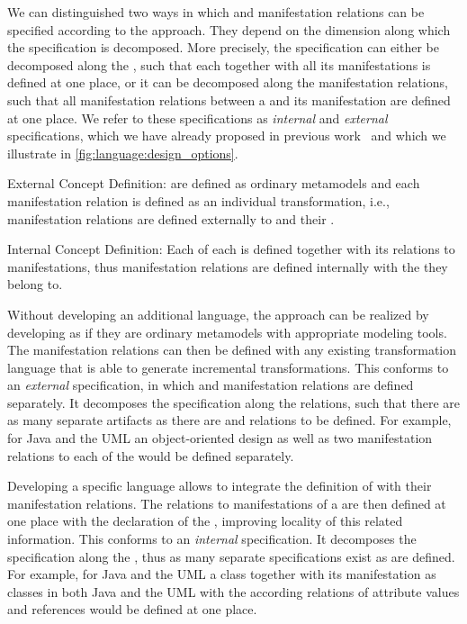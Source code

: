 We can distinguished two ways in which \conceptmetamodels and manifestation relations can be specified according to the \commonalities approach.
They depend on the dimension along which the specification is decomposed.
More precisely, the specification can either be decomposed along the \commonalities, such that each \commonality together with all its manifestations is defined at one place, or it can be decomposed along the manifestation relations, such that all manifestation relations between a \conceptmetamodel and its manifestation are defined at one place.
We refer to these specifications as \emph{internal} and \emph{external} specifications, which we have already proposed in previous work~ and which we illustrate in \autoref{fig:language:design_options}.
\begin{properdescription}
    \item[External Concept Definition:] \Conceptmetamodels are defined as ordinary metamodels and each manifestation relation is defined as an individual transformation, i.e., manifestation relations are defined externally to \conceptmetamodels and their \commonalities.
    \item[Internal Concept Definition:] Each \commonality of each \conceptmetamodel is defined together with its relations to manifestations, thus manifestation relations are defined internally with the \commonalities they belong to.
\end{properdescription}

Without developing an additional language, the \commonalities approach can be realized by developing \conceptmetamodels as if they are ordinary metamodels with appropriate modeling tools.
The manifestation relations can then be defined with any existing transformation language that is able to generate incremental transformations.
This conforms to an \emph{external} specification, in which \conceptmetamodels and manifestation relations are defined separately.
It decomposes the specification along the relations, such that there are as many separate artifacts as there are \conceptmetamodels and relations to be defined.
For example, for Java and the \gls{UML} an object-oriented design \conceptmetamodel as well as two manifestation relations to each of the \concretemetamodels would be defined separately.

Developing a specific language allows to integrate the definition of \commonalities with their manifestation relations.
The relations to manifestations of a \commonality are then defined at one place with the declaration of the \commonality, improving locality of this related information.
This conforms to an \emph{internal} specification.
It decomposes the specification along the \commonalities, thus as many separate specifications exist as \commonalities are defined.
For example, for Java and the \gls{UML} a class \commonality together with its manifestation as classes in both Java and the \gls{UML} with the according relations of attribute values and references would be defined at one place.


